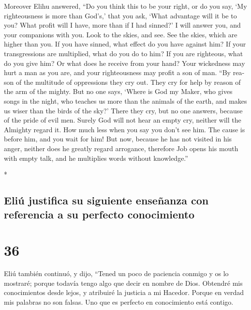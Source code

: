 \begin{paracol}{2}
\begin{otherlanguage}{english}
 Moreover Elihu answered,  ``Do you think
this to be your right, or do you say, `My righteousness is more than
God's,'  that you ask, `What advantage will it be to you?
What profit will I have, more than if I had sinned?'  I
will answer you, and your companions with you.  Look to
the skies, and see. See the skies, which are higher than you.
 If you have sinned, what effect do you have against him?
If your transgressions are multiplied, what do you do to him?
 If you are righteous, what do you give him? Or what does
he receive from your hand?  Your wickedness may hurt a man
as you are, and your righteousness may profit a son of man.
 ``By reason of the multitude of oppressions they cry out.
They cry for help by reason of the arm of the mighty. 
But no one says, `Where is God my Maker, who gives songs in the night,
 who teaches us more than the animals of the earth, and
makes us wiser than the birds of the sky?'  There they
cry, but no one answers, because of the pride of evil men.
 Surely God will not hear an empty cry, neither will the
Almighty regard it.  How much less when you say you don't
see him. The cause is before him, and you wait for him! 
But now, because he has not visited in his anger, neither does he
greatly regard arrogance,  therefore Job opens his mouth
with empty talk, and he multiplies words without knowledge.''

\end{otherlanguage}

\switchcolumn[0]*

\hypertarget{eliuxfa-justifica-su-siguiente-enseuxf1anza-con-referencia-a-su-perfecto-conocimiento}{%
\subsection{Eliú justifica su siguiente enseñanza con referencia a su
perfecto
conocimiento}\label{eliuxfa-justifica-su-siguiente-enseuxf1anza-con-referencia-a-su-perfecto-conocimiento}}

\hypertarget{section-70}{%
\section{36}\label{section-70}}

 Eliú también continuó, y dijo,  ``Tened un
poco de paciencia conmigo y os lo mostraré; porque todavía tengo algo
que decir en nombre de Dios.  Obtendré mis conocimientos
desde lejos, y atribuiré la justicia a mi Hacedor.  Porque
en verdad mis palabras no son falsas. Uno que es perfecto en
conocimiento está contigo.


\end{paracol}
